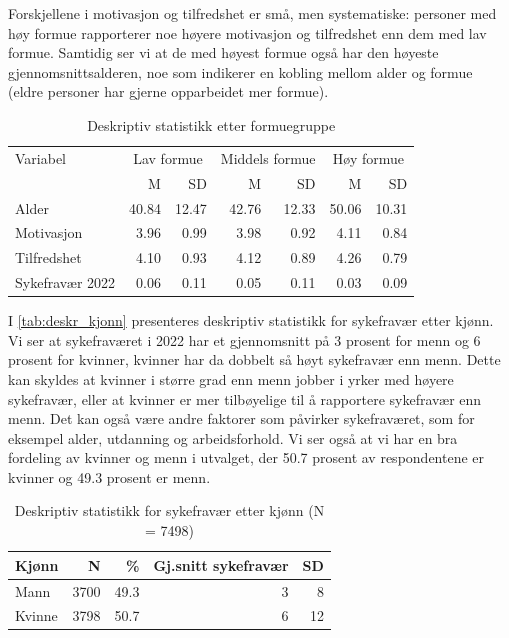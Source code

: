 \documentclass[
  12pt,
  a4paper,
  DIV=11,
  numbers=noendperiod]{scrartcl}
\begin{document}
Forskjellene i motivasjon og tilfredshet er små, men systematiske:
personer med høy formue rapporterer noe høyere motivasjon og tilfredshet
enn dem med lav formue. Samtidig ser vi at de med høyest formue også har
den høyeste gjennomsnittsalderen, noe som indikerer en kobling mellom
alder og formue (eldre personer har gjerne opparbeidet mer formue).

\begin{table}[ht]
\centering
\begin{tabular}{lrrrrrr}
\toprule
Variabel             & \multicolumn{2}{c}{Lav formue} & \multicolumn{2}{c}{Middels formue} & \multicolumn{2}{c}{Høy formue} \\
                     & M       & SD       & M         & SD        & M       & SD      \\
\midrule
Alder                & 40.84   & 12.47    & 42.76     & 12.33     & 50.06   & 10.31   \\
Motivasjon           & 3.96    & 0.99     & 3.98      & 0.92      & 4.11    & 0.84    \\
Tilfredshet          & 4.10    & 0.93     & 4.12      & 0.89      & 4.26    & 0.79    \\
Sykefravær 2022      & 0.06    & 0.11     & 0.05      & 0.11      & 0.03    & 0.09    \\
\bottomrule
\end{tabular}
\caption{Deskriptiv statistikk etter formuegruppe}
\label{tab:deskr_formue}
\end{table}

I \autoref{tab:deskr_kjonn} presenteres deskriptiv statistikk for
sykefravær etter kjønn. Vi ser at sykefraværet i 2022 har et
gjennomsnitt på 3 prosent for menn og 6 prosent for kvinner, kvinner har
da dobbelt så høyt sykefravær enn menn. Dette kan skyldes at kvinner i
større grad enn menn jobber i yrker med høyere sykefravær, eller at
kvinner er mer tilbøyelige til å rapportere sykefravær enn menn. Det kan
også være andre faktorer som påvirker sykefraværet, som for eksempel
alder, utdanning og arbeidsforhold. Vi ser også at vi har en bra
fordeling av kvinner og menn i utvalget, der 50.7 prosent av
respondentene er kvinner og 49.3 prosent er menn.

\begin{table}[ht]
\centering
\begin{tabular}{lrrrr}
\toprule
Kjønn   & N   & \%   & Gj.snitt sykefravær & SD    \\
\midrule
Mann    & 3700 & 49.3 & 3               & 8 \\
Kvinne  & 3798 & 50.7 & 6               & 12 \\
\bottomrule
\end{tabular}
\caption{Deskriptiv statistikk for sykefravær etter kjønn (N = 7498)}
\label{tab:deskr_kjonn}
\end{table}
\end{document}
